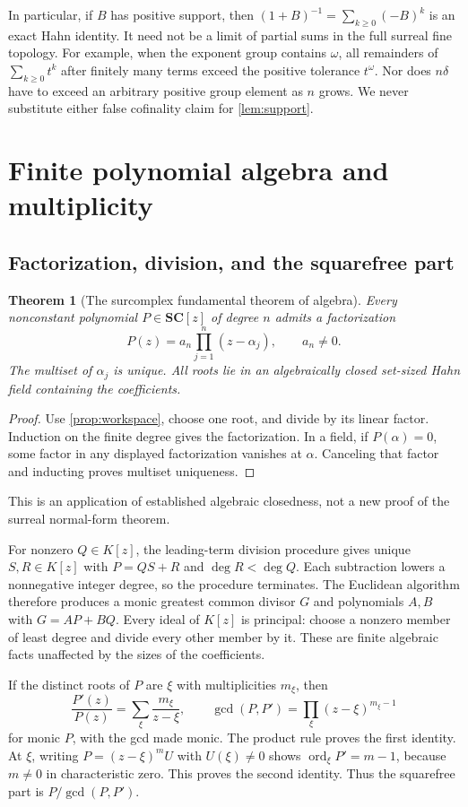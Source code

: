 \documentclass[11pt,letterpaper]{article}
\numberwithin{equation}{section}
\newtheorem{theorem}{Theorem}[section]
\theoremstyle{definition}
\theoremstyle{remark}\newtheorem{remark}[theorem]{Remark}
\newcommand{\SC}{\mathbf{SC}}
\newcommand{\ord}{\operatorname{ord}}
\begin{document}
In particular, if $B$ has positive support, then
$(1+B)^{-1}=\sum_{k\ge0}(-B)^k$ is an exact Hahn identity. It need not be
a limit of partial sums in the full surreal fine topology. For example,
when the exponent group contains $\omega$, all remainders of
$\sum_{k\ge0}t^k$ after finitely many terms exceed the positive tolerance
$t^\omega$. Nor does $n\delta$ have to exceed an arbitrary positive group
element as $n$ grows. We never substitute either false cofinality claim
for \cref{lem:support}.

\section{Finite polynomial algebra and multiplicity}\label{sec:algebra}

\subsection{Factorization, division, and the squarefree part}
\begin{theorem}[The surcomplex fundamental theorem of algebra]\label{thm:fta}
Every nonconstant polynomial $P\in\SC[z]$ of degree $n$ admits a
factorization
\[
 P(z)=a_n\prod_{j=1}^n(z-\alpha_j),\qquad a_n\ne0.
\]
The multiset of $\alpha_j$ is unique. All roots lie in an algebraically
closed set-sized Hahn field containing the coefficients.
\end{theorem}
\begin{proof}
Use \cref{prop:workspace}, choose one root, and divide by its linear
factor. Induction on the finite degree gives the factorization. In a field,
if $P(\alpha)=0$, some factor in any displayed factorization vanishes at
$\alpha$. Canceling that factor and inducting proves multiset uniqueness.
\end{proof}
This is an application of established algebraic closedness, not a new
proof of the surreal normal-form theorem.

For nonzero $Q\in K[z]$, the leading-term division procedure gives unique
$S,R\in K[z]$ with $P=QS+R$ and $\deg R<\deg Q$. Each subtraction lowers
a nonnegative integer degree, so the procedure terminates. The Euclidean
algorithm therefore produces a monic greatest common divisor $G$ and
polynomials $A,B$ with $G=AP+BQ$. Every ideal of $K[z]$ is principal:
choose a nonzero member of least degree and divide every other member by
it. These are finite algebraic facts unaffected by the sizes of the
coefficients.

If the distinct roots of $P$ are $\xi$ with multiplicities $m_\xi$, then
\begin{equation}\label{eq:logderivative}
 \frac{P'(z)}{P(z)}=\sum_\xi\frac{m_\xi}{z-\xi},\qquad
 \gcd(P,P')=\prod_\xi(z-\xi)^{m_\xi-1}
\end{equation}
for monic $P$, with the gcd made monic. The product rule proves the first
identity. At $\xi$, writing $P=(z-\xi)^mU$ with $U(\xi)\ne0$ shows
$\ord_\xi P'=m-1$, because $m\ne0$ in characteristic zero. This proves
the second identity. Thus the squarefree part is $P/\gcd(P,P')$.
\end{document}
